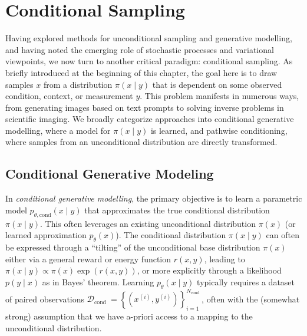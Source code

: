\section{Conditional Sampling}

Having explored methods for unconditional sampling and generative modelling, and having noted the emerging role of stochastic processes and variational viewpoints, we now turn to another critical paradigm: conditional sampling. As briefly introduced at the beginning of this chapter, the goal here is to draw samples $x$ from a distribution $\pi(x \mid y)$ that is dependent on some observed condition, context, or measurement $y$. This problem manifests in numerous ways, from generating images based on text prompts to solving inverse problems in scientific imaging. We broadly categorize approaches into conditional generative modelling, where a model for $\pi(x \mid y)$ is learned, and pathwise conditioning, where samples from an unconditional distribution are directly transformed.

\subsection{Conditional Generative Modeling}

In \emph{conditional generative modelling}, the primary objective is to learn a parametric model $p_{\theta, \text{cond}}(x \mid y)$ that approximates the true conditional distribution $\pi(x \mid y)$. This often leverages an existing unconditional distribution $\pi(x)$ (or learned approximation $p_\theta(x)$). The conditional distribution $\pi(x \mid y)$ can often be expressed through a ``tilting'' of the unconditional base distribution $\pi(x)$ either via a general reward \label{ntn:reward_function}or energy function $r(x, y)$, leading to $\pi(x \mid y) \propto \pi(x) \exp (r(x, y))$, or more explicitly through a likelihood $p(y \mid x)$ as in Bayes' theorem.\label{ntn:likelihood} Learning $p_\theta(x \mid y)$ typically requires a dataset of paired observations $\mathcal{D}_{\text {cond }}=\left\{\left(x^{(i)}, y^{(i)}\right)\right\}_{i=1}^{N_{\text {cond }}}$, often with the (somewhat strong) assumption that we have a-priori access to a mapping to the unconditional distribution.

